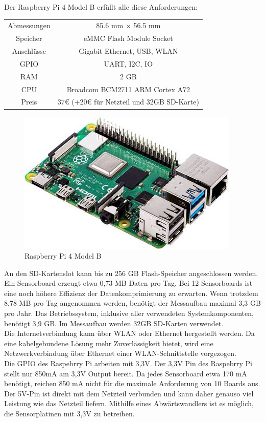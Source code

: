 Der Raspberry Pi 4 Model B erfüllt alle diese Anforderungen:

\begin{center}
\begin{tabular}{ c c }
 Abmessungen & 85.6 mm × 56.5 mm \\ 
 Speicher & eMMC Flash Module Socket \\  
 Anschlüsse & Gigabit Ethernet, USB, WLAN \\  
 GPIO & UART, I2C, IO \\  
 RAM & 2 GB \\  
 CPU & Broadcom BCM2711 ARM Cortex A72 \\  
 Preis & 37€ (+20€ für Netzteil und 32GB SD-Karte)  
\end{tabular}
\end{center}
\begin{figure}[H]
  \centering
 \includegraphics[width=0.5\linewidth]{img/Raspberry-Pi-4-Model-B}
	\caption{Raspberry Pi 4 Model B \cite{raspberrypi_fundation}}
  \label{fig:Raspberry_Pi_4_Model_B}
\end{figure}
An den SD-Kartenslot kann bis zu 256 GB Flash-Speicher angeschlossen werden.
Ein Sensorboard erzeugt etwa 0,73 MB Daten pro Tag.
Bei 12 Sensorboards ist eine noch höhere Effizienz der Datenkomprimierung zu erwarten. Wenn trotzdem 8,78 MB pro Tag angenommen werden, benötigt der Messaufbau maximal 3,3 GB pro Jahr.
Das Betriebssystem, inklusive aller verwendeten Systemkomponenten, benötigt 3,9 GB.
Im Messaufbau werden 32GB SD-Karten verwendet.\\
Die Internetverbindung kann über WLAN oder Ethernet hergestellt werden.
Da eine kabelgebundene Lösung mehr Zuverlässigkeit bietet, wird eine Netzwerkverbindung über Ethernet einer WLAN-Schnittstelle vorgezogen.\\
Die GPIO des Raspebrry Pi arbeiten mit 3,3V.
Der 3,3V Pin des Raspebrry Pi stellt nur 850mA am 3,3V Output bereit.
Da jedes Sensorboard etwa 170 mA benötigt, reichen 850 mA nicht für die maximale Anforderung von 10 Boards aus.
Der 5V-Pin ist direkt mit dem Netzteil verbunden und kann daher genauso viel Leistung wie das Netzteil liefern. Mithilfe eines Abwärtswandlers ist es möglich, die Sensorplatinen mit 3,3V zu betreiben.\\

